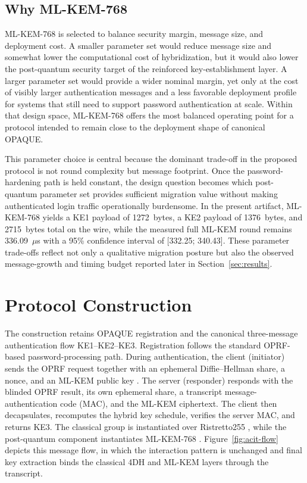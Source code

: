 \documentclass[conference]{IEEEtran}
\begin{document}
\subsection{Why ML-KEM-768}

ML-KEM-768 is selected to balance security margin, message size, and deployment cost. A smaller parameter set would reduce message size and somewhat lower the computational cost of hybridization, but it would also lower the post-quantum security target of the reinforced key-establishment layer. A larger parameter set would provide a wider nominal margin, yet only at the cost of visibly larger authentication messages and a less favorable deployment profile for systems that still need to support password authentication at scale. Within that design space, ML-KEM-768 offers the most balanced operating point for a protocol intended to remain close to the deployment shape of canonical OPAQUE.


This parameter choice is central because the dominant trade-off in the proposed protocol is not round complexity but message footprint. Once the password-hardening path is held constant, the design question becomes which post-quantum parameter set provides sufficient migration value without making authenticated login traffic operationally burdensome. In the present artifact, ML-KEM-768 yields a KE1 payload of 1272~bytes, a KE2 payload of 1376~bytes, and 2715~bytes total on the wire, while the measured full ML-KEM round remains 336.09~$\mu$s with a 95\% confidence interval of [332.25; 340.43]. These parameter trade-offs reflect not only a qualitative migration posture but also the observed message-growth and timing budget reported later in Section~\ref{sec:results}.

\section{Protocol Construction}

The construction retains OPAQUE registration and the canonical three-message authentication flow KE1--KE2--KE3. Registration follows the standard OPRF-based password-processing path. During authentication, the client (initiator) sends the OPRF request together with an ephemeral Diffie--Hellman share, a nonce, and an ML-KEM public key \cite{touil2024ssh}. The server (responder) responds with the blinded OPRF result, its own ephemeral share, a transcript message-authentication code (MAC), and the ML-KEM ciphertext. The client then decapsulates, recomputes the hybrid key schedule, verifies the server MAC, and returns KE3. The classical group is instantiated over Ristretto255 \cite{devalence2024}, while the post-quantum component instantiates ML-KEM-768 \cite{fips203}. Figure~\ref{fig:acit-flow} depicts this message flow, in which the interaction pattern is unchanged and final key extraction binds the classical 4DH and ML-KEM layers through the transcript.
\end{document}
